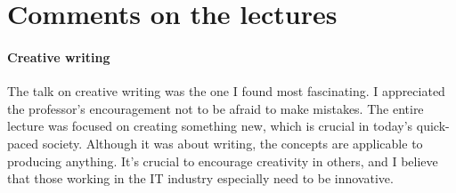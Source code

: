 \documentclass[10pt,twoside,english,a4paper]{article}
\begin{document}



\newpage
\section*{Comments on the lectures} \label{comments}
\paragraph{Creative writing}The talk on creative writing was the one I found most fascinating. I appreciated the professor's encouragement not to be afraid to make mistakes. The entire lecture was focused on creating something new, which is crucial in today's quick-paced society. Although it was about writing, the concepts are applicable to producing anything. It's crucial to encourage creativity in others, and I believe that those working in the IT industry especially need to be innovative.
\end{document}
